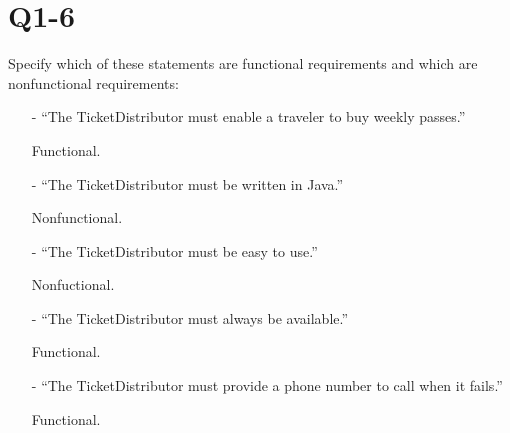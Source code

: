 \section{Q1-6}
Specify which of these statements are functional requirements and which are nonfunctional requirements:

\begin{itemize}
\item[-]“The TicketDistributor must enable a traveler to buy weekly passes.”	

Functional.
\item[-]“The TicketDistributor must be written in Java.”	

Nonfunctional.
\item[-]“The TicketDistributor must be easy to use.”	

Nonfuctional.
\item[-]“The TicketDistributor must always be available.”	

Functional.
\item[-]“The TicketDistributor must provide a phone number to call when it fails.”	

Functional.
\end{itemize}